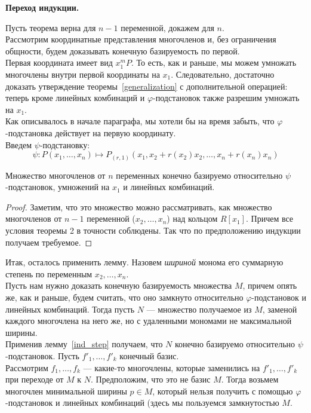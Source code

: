 \vskip 0.1in\noindent
{\large\textbf{Переход индукции.}}

Пусть теорема верна для $n-1$ переменной, докажем для $n$.\\
Рассмотрим координатные представления многочленов и, без ограничения общности, будем доказывать конечную базируемость по первой.\\
Первая координата имеет вид $x_1^m P$.
То есть, как и раньше, мы можем умножать многочлены внутри первой координаты на $x_1$.
Следовательно, достаточно доказать утверждение теоремы~\ref{generalization} с дополнительной операцией: теперь кроме линейных комбинаций и $\varphi$-подстановок также разрешим умножать на $x_1$.\\
Как описывалось в начале параграфа, мы хотели бы на время забыть, что $\varphi$-подстановка действует на первую координату. \\Введем $\psi$-подстановку:
\[\psi : P(x_1,\ldots,x_n) \mapsto P_{(r,1)}(x_1,x_2+r(x_2)x_2,\ldots,x_n+r(x_n)x_n)\]\vskip 0.1in\noindent
\begin{lemma}
    \label{ind_step}
    Множество многочленов от $n$ переменных конечно базируемо относительно $\psi$-подстановок, умножений на $x_1$ и линейных комбинаций.
\end{lemma}
\begin{proof}
    Заметим, что это множество можно рассматривать, как множество многочленов от $n-1$ переменной ($x_2,\ldots,x_n$) над кольцом $R[x_1]$.
    Причем все условия теоремы 2 в точности соблюдены.
    Так что по предположению индукции получаем требуемое.
\end{proof}
Итак, осталось применить лемму.
Назовем \textit{шириной} монома его суммарную степень по переменным $x_2,\ldots,x_n$.\\
Пусть нам нужно доказать конечную базируемость множества $M$, причем опять же, как и раньше, будем считать, что оно замкнуто относительно $\varphi$-подстановок и линейных комбинаций.
Тогда пусть $N$ --- множество получаемое из $M$, заменой каждого многочлена на него же, но с удаленными мономами не максимальной ширины.\\
Применив лемму~\ref{ind_step} получаем, что $N$ конечно базируемо относительно $\psi$-подстановок.
Пусть $f'_1,\ldots,f'_k$ конечный базис.\\
Рассмотрим $f_1,\ldots,f_k$ --- какие-то многочлены, которые заменились на $f'_1,\ldots,f'_k$ при переходе от $M$ к $N$.
Предположим, что это не базис $M$.
Тогда возьмем многочлен минимальной ширины $p\in M$, который нельзя получить с помощью $\varphi$-подстановок и линейных комбинаций (здесь мы пользуемся замкнутостью $M$.
